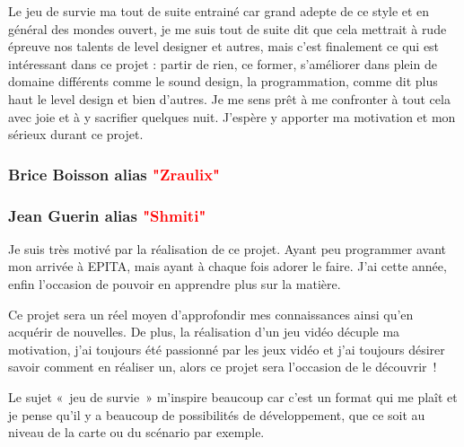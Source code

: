 \documentclass{article}
\begin{document}
\par 
Le jeu de survie ma tout de suite entrainé car grand adepte de ce style et en général des mondes ouvert, je me suis tout de suite dit que cela mettrait à rude épreuve nos talents de level designer et autres, mais c'est finalement ce qui est intéressant dans ce projet : partir de rien, ce former, s'améliorer dans plein de domaine différents comme le sound design, la programmation, comme dit plus haut le level design et bien d'autres. Je me sens prêt à me confronter à tout cela avec joie et à y sacrifier quelques nuit.
J'espère y apporter ma motivation et mon sérieux durant ce projet.
\newline





\subsubsection{Brice Boisson alias \textcolor{red}{"Zraulix"}}

\par

\newline

\subsubsection{Jean Guerin alias \textcolor{red}{"Shmiti"}}

\par 
Je suis très motivé par la réalisation de ce projet. Ayant peu programmer avant mon arrivée à EPITA, mais ayant à chaque fois adorer le faire. J’ai cette année, enfin l’occasion de pouvoir en apprendre plus sur la matière. 
\newline
\par 
Ce projet sera un réel moyen d’approfondir mes connaissances ainsi qu’en acquérir de nouvelles. De plus, la réalisation d’un jeu vidéo décuple ma motivation, j’ai toujours été passionné par les jeux vidéo et j’ai toujours désirer savoir comment en réaliser un, alors ce projet sera l’occasion de le découvrir ! 
\newline

\par 
Le sujet « jeu de survie » m’inspire beaucoup car c’est un format qui me plaît et je pense qu’il y a beaucoup de possibilités de développement, que ce soit au niveau de la carte ou du scénario par exemple. 
\newline
\end{document}
